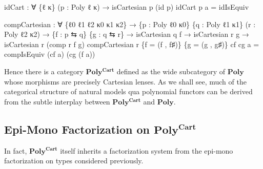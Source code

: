 \documentclass[
  11pt,
  oneside,
  article]{memoir}
\newenvironment{Shaded}{}{}
\newcommand{\NormalTok}[1]{#1}
\newcommand{\OtherTok}[1]{\textcolor[rgb]{0.00,0.44,0.13}{#1}}
\theoremstyle{definition}
\theoremstyle{plain}
\newcommand{\Cat}[1]{\mathbf{#1}}%
\newcommand{\poly}{\Cat{Poly}}
\newcommand{\0}{\textsf{0}}
\newcommand{\1}{\tn{\textsf{1}}}
\begin{document}
\begin{Shaded}
\begin{Highlighting}[]
\NormalTok{idCart }\OtherTok{:} \OtherTok{∀} \OtherTok{\{}\NormalTok{ℓ κ}\OtherTok{\}} \OtherTok{(}\NormalTok{p }\OtherTok{:}\NormalTok{ Poly ℓ κ}\OtherTok{)}
         \OtherTok{→}\NormalTok{ isCartesian p }\OtherTok{(}\NormalTok{id p}\OtherTok{)}
\NormalTok{idCart p a }\OtherTok{=}\NormalTok{ idIsEquiv}

\NormalTok{compCartesian }\OtherTok{:} \OtherTok{∀} \OtherTok{\{}\NormalTok{ℓ0 ℓ1 ℓ2 κ0 κ1 κ2}\OtherTok{\}}
                \OtherTok{→} \OtherTok{\{}\NormalTok{p }\OtherTok{:}\NormalTok{ Poly ℓ0 κ0}\OtherTok{\}} \OtherTok{\{}\NormalTok{q }\OtherTok{:}\NormalTok{ Poly ℓ1 κ1}\OtherTok{\}} \OtherTok{(}\NormalTok{r }\OtherTok{:}\NormalTok{ Poly ℓ2 κ2}\OtherTok{)}
                \OtherTok{→} \OtherTok{\{}\NormalTok{f }\OtherTok{:}\NormalTok{ p ⇆ q}\OtherTok{\}} \OtherTok{\{}\NormalTok{g }\OtherTok{:}\NormalTok{ q ⇆ r}\OtherTok{\}}
                \OtherTok{→}\NormalTok{ isCartesian q f }\OtherTok{→}\NormalTok{ isCartesian r g }
                \OtherTok{→}\NormalTok{ isCartesian r }\OtherTok{(}\NormalTok{comp r f g}\OtherTok{)}
\NormalTok{compCartesian r }\OtherTok{\{}\NormalTok{f }\OtherTok{=} \OtherTok{(}\NormalTok{f , f♯}\OtherTok{)\}} \OtherTok{\{}\NormalTok{g }\OtherTok{=} \OtherTok{(}\NormalTok{g , g♯}\OtherTok{)\}}\NormalTok{ cf cg a }\OtherTok{=} 
\NormalTok{    compIsEquiv }\OtherTok{(}\NormalTok{cf a}\OtherTok{)} \OtherTok{(}\NormalTok{cg }\OtherTok{(}\NormalTok{f a}\OtherTok{))}
\end{Highlighting}
\end{Shaded}

Hence there is a category \(\mathbf{Poly^{Cart}}\) defined as the wide
subcategory of \(\poly\) whose morphisms are precisely Cartesian
lenses. As we shall see, much of the categorical structure of natural
models qua polynomial functors can be derived from the subtle interplay
between \(\mathbf{Poly^{Cart}}\) and \(\poly\).

\subsection{\texorpdfstring{Epi-Mono Factorization on
\(\mathbf{Poly^{Cart}}\)}{Epi-Mono Factorization on \textbackslash mathbf\{Poly\^{}\{Cart\}\}}}\label{epi-mono-factorization-on-mathbfpolycart}

In fact, \(\mathbf{Poly^{Cart}}\) itself inherits a factorization system
from the epi-mono factorization on types considered previously.
\end{document}
